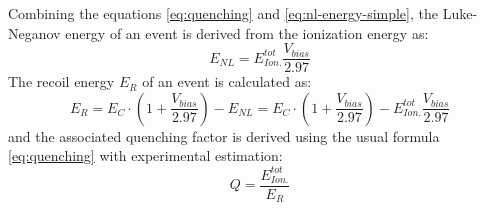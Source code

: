 Combining the equations \ref{eq:quenching} and \ref{eq:nl-energy-simple}, the Luke-Neganov energy of an event is derived from the ionization energy as:
\begin{equation}
E_{NL} = E_{Ion.}^{tot} \frac{V_{bias}}{2.97}
\end{equation}
The recoil energy $E_R$ of an event is calculated as:
\begin{equation}
E_R = E_C \cdot \left( 1 + \frac{V_{bias}}{2.97} \right) - E_{NL}
= E_C \cdot \left( 1 + \frac{V_{bias}}{2.97} \right) - E_{Ion.}^{tot} \frac{V_{bias}}{2.97}
\end{equation}
and the associated quenching factor is derived using the usual formula \ref{eq:quenching} with experimental estimation:
\begin{equation}
Q = \frac{E_{Ion.}^{tot}}{E_R}
\end{equation}


